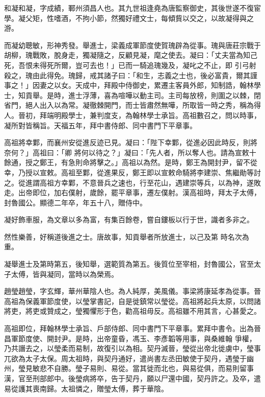 
\begin{pinyinscope}

 和凝和凝，字成績，鄆州須昌人也。其九世祖逢堯為唐監察御史，其後世遂不復宦學。凝父矩，性嗜酒，不拘小節，然獨好禮文士，每傾貲以交之，以故凝得與之游。



 而凝幼聰敏，形神秀發。舉進士，梁義成軍節度使賀瑰辟為從事。瑰與唐莊宗戰于胡柳，瑰戰敗，脫身走，獨凝隨之，反顧見凝，麾之使去。凝曰：「丈夫當為知己死，吾恨未得死所爾，豈可去也！」已而一騎追瑰幾及，凝叱之不止，即
 引弓射殺之，瑰由此得免。瑰歸，戒其諸子曰：「和生，志義之士也，後必富貴，爾其謹事之！」因妻之以女。天成中，拜殿中侍御史，累遷主客員外郎，知制誥，翰林學士，知貢舉。是時，進士浮薄，喜為喧嘩以動主司。主司每放榜，則圍之以棘，閉省門，絕人出入以為常。凝徹棘開門，而士皆肅然無嘩，所取皆一時之秀，稱為得人。晉初，拜端明殿學士，兼判度支，為翰林學士承旨。高祖數召之，問以時事，凝所對皆稱旨。天福五年，拜中書侍郎、同中書門下平章事。



 高祖將幸鄴，而襄州安從進反迹已見。凝曰：「陛下幸鄴，從進必因此時反，則將奈何？」高祖曰：「卿
 將何以待之？」凝曰：「先人者，所以奪人也。請為宣敕十餘通，授之鄭王，有急則命將擊之。」高祖以為然。是時，鄭王為開封尹，留不從幸，乃授以宣敕。高祖至鄴，從進果反，鄭王即以宣敕命騎將李建崇、焦繼勛等討之。從進謂高祖方幸鄴，不意晉兵之速也，行至花山，遇建崇等兵，以為神，遂敗走。出帝即位，加右僕射，歲餘，罷平章事，遷左僕射。漢高祖時，拜太子太傅，封魯國公。顯德二年卒，年五十八，贈侍中。



 凝好飾車服，為文章以多為富，有集百餘卷，嘗自鏤板以行于世，識者多非之。



 然性樂善，好稱道後進之士。唐故事，知貢舉者所放進士，以己及第
 時名次為重。



 凝舉進士及第時第五，後知舉，選範質為第五。後質位至宰相，封魯國公，官至太子太傅，皆與凝同，當時以為榮焉。



 趙瑩趙瑩，字玄輝，華州華陰人也。為人純厚，美風儀。事梁將康延孝為從事。晉高祖為保義軍節度使，以瑩掌書記，自是徙鎮常以瑩從。高祖將起兵太原，以問諸將吏，將吏或贊成之，瑩獨懼形于色，勸高祖毋反。高祖雖不用其言，心甚愛之。



 高祖即位，拜翰林學士承旨、戶部侍郎、同中書門下平章事。累拜中書令。出為晉昌軍節度使、開封尹。是時，出帝童昏，馮玉、李彥韜等用事，與桑維翰
 爭權，乃共譖去之，以瑩柔而易制，故復引以為相。契丹滅晉，瑩從出帝北徙虜中，瑩事兀欲為太子太保。周太祖時，與契丹通好，遣尚書左丞田敏使于契丹，遇瑩于幽州，瑩見敏悲不自勝。瑩子易則、易從。當其徙而北也，與易從俱，而易則留事漢，官至刑部郎中。後瑩病將卒，告于契丹，願以尸還中國，契丹許之。及卒，遣易從護其喪南歸。太祖憐之，贈瑩太傅，葬于華陰。




\end{pinyinscope}
